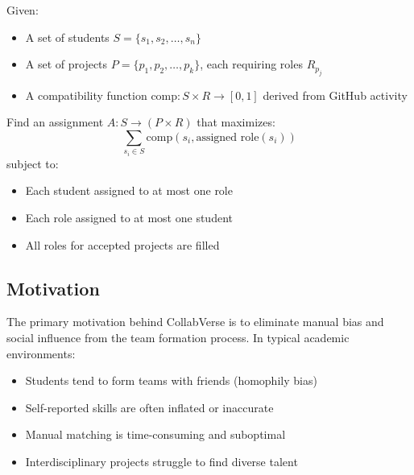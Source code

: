 \documentclass[12pt,a4paper]{article}
\begin{document}
\begin{definition}
Given:
\begin{itemize}
    \item A set of students \( S = \{s_1, s_2, \ldots, s_n\} \)
    \item A set of projects \( P = \{p_1, p_2, \ldots, p_k\} \), each requiring roles \( R_{p_j} \)
    \item A compatibility function \( \text{comp}: S \times R \rightarrow [0,1] \) derived from GitHub activity
\end{itemize}
Find an assignment \( A: S \rightarrow (P \times R) \) that maximizes:
\[
\sum_{s_i \in S} \text{comp}(s_i, \text{assigned role}(s_i))
\]
subject to:
\begin{itemize}
    \item Each student assigned to at most one role
    \item Each role assigned to at most one student
    \item All roles for accepted projects are filled
\end{itemize}
\end{definition}

\subsection{Motivation}
The primary motivation behind CollabVerse is to eliminate manual bias and social influence from the team formation process. In typical academic environments:

\begin{itemize}
    \item Students tend to form teams with friends (homophily bias)
    \item Self-reported skills are often inflated or inaccurate
    \item Manual matching is time-consuming and suboptimal
    \item Interdisciplinary projects struggle to find diverse talent
\end{itemize}
\end{document}
